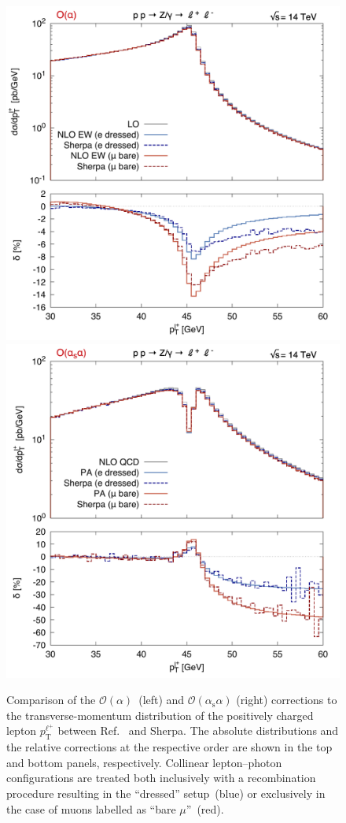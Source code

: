 \documentclass[11pt]{cernrep}
\newcommand{\order}{\ensuremath{\mathcal{O}}}
\newcommand{\alphas}{\ensuremath{\alpha_\mathrm{s}}}
\newcommand{\rT}{\ensuremath{\mathrm{T}}} %
\DeclareRobustCommand{\Plp}{{\ensuremath{\ell^+}}}
\begin{document}
\begin{figure}
  \includegraphics[width=.48\linewidth]{images/Z_ptl+2_LO.pdf} \hfill
  \includegraphics[width=.48\linewidth]{images/Z_ptl+2_NLO.pdf} 
  \caption{
    Comparison of the $\order(\alpha)$~(left) and $\order(\alphas\alpha)$ 
    (right) corrections to the transverse-momentum distribution of the 
    positively charged lepton $p_\rT^\Plp$ between 
    Ref.~\cite{Dittmaier:2015rxo} and Sherpa. The absolute distributions 
    and the relative corrections at the respective order are shown in the 
    top and bottom panels, respectively. Collinear lepton--photon 
    configurations are treated both inclusively with a recombination 
    procedure resulting in the ``dressed'' setup~(blue) or exclusively in 
    the case of muons labelled as ``bare $\mu$''~(red).
  }
  \label{fig:dyew:ptl}
\end{figure}
\end{document}
